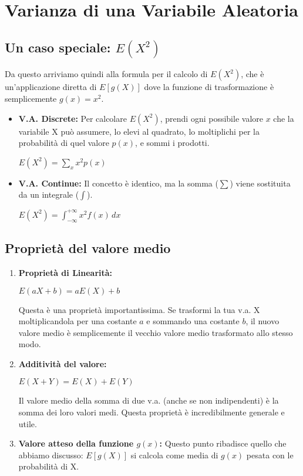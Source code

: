 \documentclass[a4paper, 11pt]{article}
\theoremstyle{definition}
\begin{document}
\section{Varianza di una Variabile Aleatoria}

\subsection{Un caso speciale: $E(X^2)$}
Da questo arriviamo quindi alla formula per il calcolo di $E(X^2)$, che è un'applicazione diretta di $E[g(X)]$ dove la funzione di trasformazione è semplicemente $g(x) = x^2$.
\begin{itemize}
    \item \textbf{V.A. Discrete:} Per calcolare $E(X^2)$, prendi ogni possibile valore $x$ che la variabile X può assumere, lo elevi al quadrato, lo moltiplichi per la probabilità di quel valore $p(x)$, e sommi i prodotti.
    \begin{formulabox}
        $E(X^2) = \sum_x x^2 p(x)$
    \end{formulabox}

    \item \textbf{V.A. Continue:} Il concetto è identico, ma la somma ($\sum$) viene sostituita da un integrale ($\int$).
    \begin{formulabox}
        $E(X^2) = \int_{-\infty}^{+\infty} x^2 f(x) \, dx$
    \end{formulabox}
\end{itemize}

\subsection{Proprietà del valore medio}
\begin{enumerate}
    \item \textbf{Proprietà di Linearità:}
    \begin{formulabox}
        $E(aX + b) = aE(X) + b$
    \end{formulabox}
    Questa è una proprietà importantissima. Se trasformi la tua v.a. X moltiplicandola per una costante $a$ e sommando una costante $b$, il nuovo valore medio è semplicemente il vecchio valore medio trasformato allo stesso modo.

    \item \textbf{Additività del valore:}
    \begin{formulabox}
        $E(X+Y) = E(X) + E(Y)$
    \end{formulabox}
    Il valore medio della somma di due v.a. (anche se non indipendenti) è la somma dei loro valori medi. Questa proprietà è incredibilmente generale e utile.

    \item \textbf{Valore atteso della funzione $g(x)$:} Questo punto ribadisce quello che abbiamo discusso: $E[g(X)]$ si calcola come media di $g(x)$ pesata con le probabilità di X.
\end{enumerate}
\end{document}
